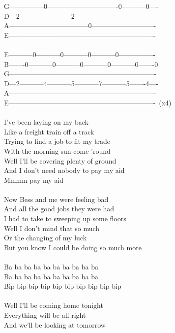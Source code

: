 {G---------------0-------------------------------0-----------0----\\
D---2-----------------------2------------------------------------\\
A-----------------------------------0----------------------------\\
E----------------------------------------------------------------\\
\\
E-----------0-----------0-----------0-----------0----------------\\
B-------0-----------0-----------0-----------0-----------0-------0\\
G----------------------------------------------------------------\\
D---2-----------4-----------5-----------7-----------5-------4----\\
A----------------------------------------------------------------\\
E----------------------------------------------------------------\ (x4)\\
\\
I've been laying on my back\\
Like a freight train off a track\\
Trying to find a job to fit my trade\\
With the morning sun come 'round\\
Well I'll be covering plenty of ground\\
And I don't need nobody to pay my aid\\
Mmmm pay my aid\\
\\
Now Bess and me were feeling bad\\
And all the good jobs they were had\\
I had to take to sweeping up some floors\\
Well I don't mind that so much\\
Or the changing of my luck\\
But you know I could be doing so much more\\
\\
Ba ba ba ba ba ba ba ba ba ba\\
Ba ba ba ba ba ba ba ba ba ba\\
Bip bip bip bip bip bip bip bip bip bip\\
\\
Well I'll be coming home tonight\\
Everything will be all right\\
And we'll be looking at tomorrow }

